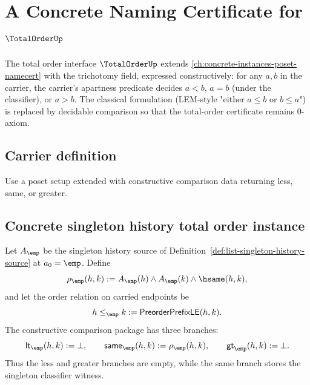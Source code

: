 \chapter{A Concrete Naming Certificate for $\TotalOrderUp$}
\label{ch:concrete-instances-totalorder-namecert}

The total order interface $\TotalOrderUp$ extends \autoref{ch:concrete-instances-poset-namecert} with the trichotomy field, expressed constructively: for any $a, b$ in the carrier, the carrier's apartness predicate decides $a < b$, $a = b$ (under the classifier), or $a > b$. The classical formulation (LEM-style "either $a \le b$ or $b \le a$") is replaced by decidable comparison so that the total-order certificate remains 0-axiom.

\section{Carrier definition}

\begin{definition}
\label{def:totalorder-carrier}
Use a poset setup extended with constructive comparison data returning less, same, or greater.
\end{definition}

\section{Concrete singleton history total order instance}
\label{sec:totalorder-concrete-singleton-history-instance}

\begin{definition}
\label{def:concrete-singleton-history-totalorder-instance}
Let $A_{\emp}$ be the singleton history source of
Definition~\ref{def:list-singleton-history-source} at $a_0=\emp$. Define
$$
\rho_{\emp}(h,k):=
A_{\emp}(h)\land A_{\emp}(k)\land\hsame(h,k),
$$
and let the order relation on carried endpoints be
$$
h\le_{\emp}k:=\mathsf{PreorderPrefixLE}(h,k).
$$
The constructive comparison package has three branches:
$$
\mathsf{lt}_{\emp}(h,k):=\bot,\qquad
\mathsf{same}_{\emp}(h,k):=\rho_{\emp}(h,k),\qquad
\mathsf{gt}_{\emp}(h,k):=\bot.
$$
Thus the less and greater branches are empty, while the same branch stores the
singleton classifier witness.
\end{definition}


